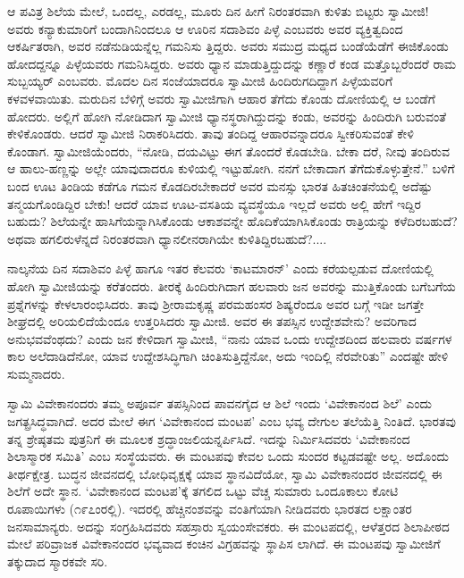 ಆ ಪವಿತ್ರ ಶಿಲೆಯ ಮೇಲೆ, ಒಂದಲ್ಲ, ಎರಡಲ್ಲ, ಮೂರು ದಿನ ಹೀಗೆ ನಿರಂತರವಾಗಿ ಕುಳಿತು ಬಿಟ್ಟರು ಸ್ವಾಮೀಜಿ! ಅವರು ಕನ್ಯಾಕುಮಾರಿಗೆ ಬಂದಾಗಿನಿಂದಲೂ ಆ ಊರಿನ ಸದಾಶಿವಂ ಪಿಳ್ಳೆ ಎಂಬವರು ಅವರ ವ್ಯಕ್ತಿತ್ವದಿಂದ ಆಕರ್ಷಿತರಾಗಿ, ಅವರ ನಡೆನುಡಿಯನ್ನೆಲ್ಲ ಗಮನಿಸು ತ್ತಿದ್ದರು. ಅವರು ಸಮುದ್ರ ಮಧ್ಯದ ಬಂಡೆಯೆಡೆಗೆ ಈಜಿಕೊಂಡು ಹೋದದ್ದನ್ನೂ ಪಿಳ್ಳೆಯವರು ಗಮನಿಸಿದ್ದರು. ಅವರು ಧ್ಯಾನ ಮಾಡುತ್ತಿದ್ದುದನ್ನು ಕಣ್ಣಾರೆ ಕಂಡ ಮತ್ತೊಬ್ಬರೆಂದರೆ ರಾಮ ಸುಬ್ಬಯ್ಯರ್ ಎಂಬವರು. ಮೊದಲ ದಿನ ಸಂಜೆಯಾದರೂ ಸ್ವಾಮೀಜಿ ಹಿಂದಿರುಗದಿದ್ದಾಗ ಪಿಳ್ಳೆಯವರಿಗೆ ಕಳವಳವಾಯಿತು. ಮರುದಿನ ಬೆಳಿಗ್ಗೆ ಅವರು ಸ್ವಾಮೀಜಿಗಾಗಿ ಆಹಾರ ತೆಗೆದು ಕೊಂಡು ದೋಣಿಯಲ್ಲಿ ಆ ಬಂಡೆಗೆ ಹೋದರು. ಅಲ್ಲಿಗೆ ಹೋಗಿ ನೋಡಿದಾಗ ಸ್ವಾಮೀಜಿ ಧ್ಯಾನಸ್ಥರಾಗಿದ್ದುದನ್ನು ಕಂಡು, ಅವರನ್ನು ಹಿಂದಿರುಗಿ ಬರುವಂತೆ ಕೇಳಿಕೊಂಡರು. ಆದರೆ ಸ್ವಾಮೀಜಿ ನಿರಾಕರಿಸಿದರು. ತಾವು ತಂದಿದ್ದ ಆಹಾರವನ್ನಾದರೂ ಸ್ವೀಕರಿಸುವಂತೆ ಕೇಳಿ ಕೊಂಡಾಗ. ಸ್ವಾಮೀಜಿಯೆಂದರು, “ನೋಡಿ, ದಯವಿಟ್ಟು ಈಗ ತೊಂದರೆ ಕೊಡಬೇಡಿ. ಬೇಕಾ ದರೆ, ನೀವು ತಂದಿರುವ ಆ ಹಾಲು-ಹಣ್ಣನ್ನು ಅಲ್ಲೇ ಯಾವುದಾದರೂ ಕುಳಿಯಲ್ಲಿ ಇಟ್ಟುಹೋಗಿ. ನನಗೆ ಬೇಕಾದಾಗ ತೆಗೆದುಕೊಳ್ಳುತ್ತೇನೆ.” ಬಳಿಗೆ ಬಂದ ಊಟ ತಿಂಡಿಯ ಕಡೆಗೂ ಗಮನ ಕೊಡದಿರಬೇಕಾದರೆ ಅವರ ಮನಸ್ಸು ಭಾರತ ಹಿತಚಿಂತನೆಯಲ್ಲಿ ಅದೆಷ್ಟು ತನ್ಮಯಗೊಂಡಿದ್ದಿರ ಬೇಕು! ಆದರೆ ಯಾವ ಊಟ-ವಸತಿಯ ವ್ಯವಸ್ಥೆಯೂ ಇಲ್ಲದೆ ಅವರು ಅಲ್ಲಿ ಹೇಗೆ ಇದ್ದಿರ ಬಹುದು? ಶಿಲೆಯನ್ನೇ ಹಾಸಿಗೆಯನ್ನಾಗಿಸಿಕೊಂಡು ಆಕಾಶವನ್ನೇ ಹೊದಿಕೆಯಾಗಿಸಿಕೊಂಡು ರಾತ್ರಿಯನ್ನು ಕಳೆದಿರಬಹುದೆ? ಅಥವಾ ಹಗಲಿರುಳೆನ್ನದೆ ನಿರಂತರವಾಗಿ ಧ್ಯಾನಲೀನರಾಗಿಯೇ ಕುಳಿತಿದ್ದಿರಬಹುದೆ?....

ನಾಲ್ಕನೆಯ ದಿನ ಸದಾಶಿವಂ ಪಿಳ್ಳೆ ಹಾಗೂ ಇತರ ಕೆಲವರು ‘ಕಾಟಮಾರನ್​’ ಎಂದು ಕರೆಯಲ್ಪಡುವ ದೋಣಿಯಲ್ಲಿ ಹೋಗಿ ಸ್ವಾಮೀಜಿಯನ್ನು ಕರೆತಂದರು. ತೀರಕ್ಕೆ ಹಿಂದಿರುಗಿದಾಗ ಹಲವಾರು ಜನ ಅವರನ್ನು ಮುತ್ತಿಕೊಂಡು ಬಗೆಬಗೆಯ ಪ್ರಶ್ನೆಗಳನ್ನು ಕೇಳಲಾರಂಭಿಸಿದರು. ತಾವು ಶ್ರೀರಾಮಕೃಷ್ಣ ಪರಮಹಂಸರ ಶಿಷ್ಯರೆಂದೂ ಅವರ ಬಗ್ಗೆ ಇಡೀ ಜಗತ್ತೇ ಶೀಘ್ರದಲ್ಲಿ ಅರಿಯಲಿದೆಯೆಂದೂ ಉತ್ತರಿಸಿದರು ಸ್ವಾಮೀಜಿ. ಅವರ ಈ ತಪಸ್ಸಿನ ಉದ್ದೇಶವೇನು? ಅವರಿಗಾದ ಅನುಭವವೆಂಥದು? ಎಂದು ಜನ ಕೇಳಿದಾಗ ಸ್ವಾಮೀಜಿ, “ನಾನು ಯಾವ ಒಂದು ಉದ್ದೇಶದಿಂದ ಹಲವಾರು ವರ್ಷಗಳ ಕಾಲ ಅಲೆದಾಡಿದೆನೋ, ಯಾವ ಉದ್ದೇಶಸಿದ್ಧಿಗಾಗಿ ಚಿಂತಿಸುತ್ತಿದ್ದೆನೋ, ಅದು ಇಂದಿಲ್ಲಿ ನೆರವೇರಿತು” ಎಂದಷ್ಟೇ ಹೇಳಿ ಸುಮ್ಮನಾದರು.

ಸ್ವಾಮಿ ವಿವೇಕಾನಂದರು ತಮ್ಮ ಅಪೂರ್ವ ತಪಸ್ಸಿನಿಂದ ಪಾವನಗೈದ ಆ ಶಿಲೆ ಇಂದು ‘ವಿವೇಕಾನಂದ ಶಿಲೆ’ ಎಂದು ಜಗತ್ಪ್ರಸಿದ್ಧವಾಗಿದೆ. ಅದರ ಮೇಲೆ ಈಗ ‘ವಿವೇಕಾನಂದ ಮಂಟಪ’ ಎಂಬ ಭವ್ಯ ದೇಗುಲ ತಲೆಯೆತ್ತಿ ನಿಂತಿದೆ. ಭಾರತವು ತನ್ನ ಶ್ರೇಷ್ಠತಮ ಪುತ್ರನಿಗೆ ಈ ಮೂಲಕ ಶ್ರದ್ಧಾಂಜಲಿಯನ್ನರ್ಪಿಸಿದೆ. ಇದನ್ನು ನಿರ್ಮಿಸಿದವರು ‘ವಿವೇಕಾನಂದ ಶಿಲಾಸ್ಮಾರಕ ಸಮಿತಿ’ ಎಂಬ ಸಂಸ್ಥೆಯವರು. ಈ ಮಂಟಪವು ಕೇವಲ ಒಂದು ಸುಂದರ ಕಟ್ಟಡವಷ್ಟೇ ಅಲ್ಲ. ಅದೊಂದು ತೀರ್ಥಕ್ಷೇತ್ರ. ಬುದ್ಧನ ಜೀವನದಲ್ಲಿ ಬೋಧಿವೃಕ್ಷಕ್ಕೆ ಯಾವ ಸ್ಥಾನವಿದೆಯೋ, ಸ್ವಾಮಿ ವಿವೇಕಾನಂದರ ಜೀವನದಲ್ಲಿ ಈ ಶಿಲೆಗೆ ಅದೇ ಸ್ಥಾನ. ‘ವಿವೇಕಾನಂದ ಮಂಟಪ’ಕ್ಕೆ ತಗಲಿದ ಒಟ್ಟು ವೆಚ್ಚ ಸುಮಾರು ಒಂದೂಕಾಲು ಕೋಟಿ ರೂಪಾಯಿಗಳು (೧೯೭ಂರಲ್ಲಿ). ಇದರಲ್ಲಿ ಹೆಚ್ಚಿನಂಶವನ್ನು ವಂತಿಗೆಯಾಗಿ ನೀಡಿದವರು ಭಾರತದ ಲಕ್ಷಾಂತರ ಜನಸಾಮಾನ್ಯರು. ಅದನ್ನು ಸಂಗ್ರಹಿಸಿದವರು ಸಹಸ್ರಾರು ಸ್ವಯಂಸೇವಕರು. ಈ ಮಂಟಪದಲ್ಲಿ, ಆಳೆತ್ತರದ ಶಿಲಾಪೀಠದ ಮೇಲೆ ಪರಿವ್ರಾಜಕ ವಿವೇಕಾನಂದರ ಭವ್ಯವಾದ ಕಂಚಿನ ವಿಗ್ರಹವನ್ನು ಸ್ಥಾಪಿಸ ಲಾಗಿದೆ. ಈ ಮಂಟಪವು ಸ್ವಾಮೀಜಿಗೆ ತಕ್ಕುದಾದ ಸ್ಮಾರಕವೇ ಸರಿ.

